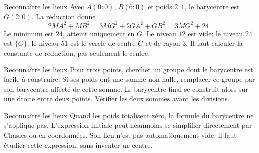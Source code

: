 \documentclass[aspectratio=169,10pt]{beamer}
\begin{document}
\begin{frame}{Reconnaître les lieux}
Avec \(A(0;0)\), \(B(6;0)\) et poids \(2,1\), le barycentre est \(G(2;0)\). La réduction donne
\[
2MA^2+MB^2=3MG^2+2GA^2+GB^2=3MG^2+24.
\]
Le minimum est \(24\), atteint uniquement en \(G\). Le niveau \(12\) est vide; le niveau \(24\) est \(\{G\}\); le niveau \(51\) est le cercle de centre \(G\) et de rayon \(3\). Il faut calculer la constante de réduction, pas seulement le centre.
\end{frame}
\begin{frame}{Reconnaître les lieux}
Pour trois points, chercher un groupe dont le barycentre est facile à construire. Si ses poids ont une somme non nulle, remplacer ce groupe par son barycentre affecté de cette somme. Le barycentre final se construit alors sur une droite entre deux points. Vérifier les deux sommes avant les divisions.
\end{frame}
\begin{frame}{Reconnaître les lieux}
Quand les poids totalisent zéro, la formule du barycentre ne s’applique pas. L’expression initiale peut néanmoins se simplifier directement par Chasles ou en coordonnées. Son lieu n’est pas automatiquement vide; il faut étudier cette expression, sans inventer un centre.
\end{frame}
\end{document}
